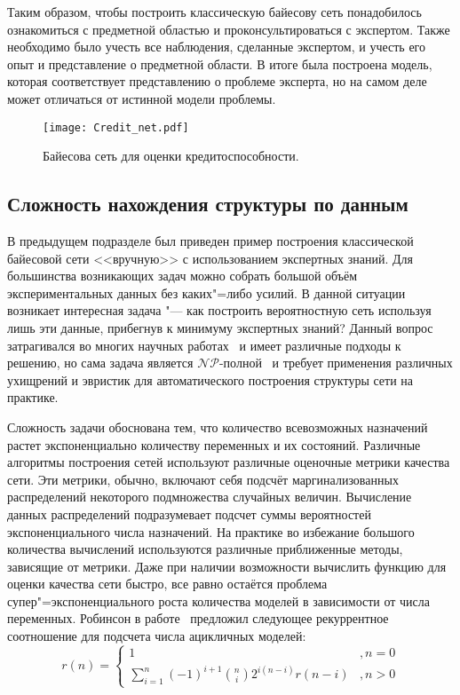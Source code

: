 Таким образом, чтобы построить классическую байесову сеть понадобилось ознакомиться с предметной областью и проконсультироваться с экспертом.
Также необходимо было учесть все наблюдения, сделанные экспертом, и учесть его опыт и представление о предметной области.
В итоге была построена модель, которая соответствует представлению о проблеме эксперта, но на самом деле может отличаться от истинной модели проблемы.

\begin{figure}[ht]
\centering
  \texttt{[image: Credit\_net.pdf]}
  \caption{ Байесова сеть для оценки кредитоспособности. }
  \label{fig:domain:manual_structure:credit_net}
\end{figure}


\subsection{Сложность нахождения структуры по данным}
\label{sub:domain:learning_complexity}

В предыдущем подразделе был приведен пример построения классической байесовой сети <<вручную>> с использованием экспертных знаний.
Для большинства возникающих задач можно собрать большой объём экспериментальных данных без каких"=либо усилий.
В данной ситуации возникает интересная задача "--- как построить вероятностную сеть используя лишь эти данные, прибегнув к минимуму экспертных знаний?
Данный вопрос затрагивался во многих научных работах~\cite{Lam94learningbayesian,Suzuki93,Cooper1991,terentyev_2006} и имеет различные подходы к решению, но сама задача является $\mathcal{NP}$-полной~\cite{Chickering96learningbayesian} и требует применения различных ухищрений и эвристик для автоматического построения структуры сети на практике.

Сложность задачи обоснована тем, что количество всевозможных назначений растет экспоненциально количеству переменных и их состояний.
Различные алгоритмы построения сетей используют различные оценочные метрики качества сети.
Эти метрики, обычно, включают себя подсчёт маргинализованных распределений некоторого подмножества случайных величин.
Вычисление данных распределений подразумевает подсчет суммы вероятностей экспоненциального числа назначений.
На практике во избежание большого количества вычислений используются различные приближенные методы, зависящие от метрики.
Даже при наличии возможности вычислить функцию для оценки качества сети быстро, все равно остаётся проблема супер"=экспоненциального роста количества моделей в зависимости от числа переменных.
Робинсон в работе~\cite{robinson_1977} предложил следующее рекуррентное соотношение для подсчета числа ацикличных моделей:
\begin{equation}
  r (n) =
  \begin{cases}
      1 &, n = 0 \\
      \sum_{i = 1}^{n} (-1)^{i+1} \binom{n}{i} 2^{i(n-i)} r(n - i) &, n > 0
  \end{cases} %
\end{equation}

